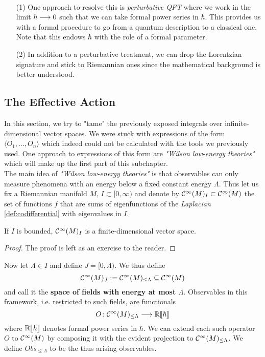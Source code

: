 \begin{rem}~
\begin{itemize}
  \item[(1)] One approach to resolve this is \emph{perturbative QFT} where we work in the limit $\hbar \longrightarrow 0$ such that we can take formal power series in $\hbar$. This provides us with a formal procedure to go from a quantum description to a classical one. Note that this endows $\hbar$ with the role of a formal parameter.

  \item[(2)] In addition to a perturbative treatment, we can drop the Lorentzian signature and stick to Riemannian ones since the mathematical background is better understood.
\end{itemize}
\end{rem}


\subsection{The Effective Action}
\label{subsec:effective_action}

In this section, we try to "tame" the previously exposed integrals over infinite-dimensional vector spaces. We were stuck with expressions of the form $\langle O_1, ..., O_n \rangle$ which indeed could not be calculated with the tools we previously used. One approach to expressions of this form are \emph{"Wilson low-energy theories"} which will make up the first part of this subchapter.\\

The main idea of \emph{"Wilson low-energy theories"} is that observables can only measure phenomena with an energy below a fixed constant energy $\Lambda$. Thus let us fix a Riemannian manifold $M$, $I \subset [0,\infty)$ and denote by $\mathcal{C}^{\infty}(M)_I \subset \mathcal{C}^{\infty}(M)$ the set of functions $f$ that are sums of eigenfunctions of the \emph{Laplacian} \ref{def:codifferential} with eigenvalues in $I$.

\begin{lem}
  If $I$ is bounded, $\mathcal{C}^{\infty}(M)_I$ is a finite-dimensional vector space.
\begin{proof}
  The proof is left as an exercise to the reader.
\end{proof}
\end{lem}

Now let $\Lambda \in I$ and define $J = [0,\Lambda)$. We thus define
$$ \mathcal{C}^{\infty}(M)_J := \mathcal{C}^{\infty}(M)_{\leq \Lambda} \subseteq \mathcal{C}^{\infty}(M) $$
and call it the \textbf{space of fields with energy at most $\Lambda$}. Observables in this framework, i.e. restricted to such fields, are functionals
$$ O \colon \mathcal{C}^{\infty}(M)_{\leq \Lambda} \longrightarrow \mathbb{R}\llbracket\hbar\rrbracket $$
where $\mathbb{R}\llbracket\hbar\rrbracket$ denotes formal power series in $\hbar$. We can extend each such operator $O$ to $\mathcal{C}^{\infty}(M)$ by composing it with the evident projection to $\mathcal{C}^{\infty}(M)_{\leq \Lambda}$. We define $Obs_{\leq \Lambda}$ to be the thus arising observables.\\

